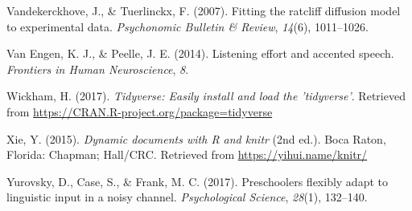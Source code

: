 \documentclass[english,man]{apa6}
\theoremstyle{definition}
\theoremstyle{definition}
\theoremstyle{definition}
\theoremstyle{remark}
\begin{document}
\leavevmode\hypertarget{ref-vandekerckhove2007fitting}{}%
Vandekerckhove, J., \& Tuerlinckx, F. (2007). Fitting the ratcliff
diffusion model to experimental data. \emph{Psychonomic Bulletin \&
Review}, \emph{14}(6), 1011--1026.

\leavevmode\hypertarget{ref-van2014listening}{}%
Van Engen, K. J., \& Peelle, J. E. (2014). Listening effort and accented
speech. \emph{Frontiers in Human Neuroscience}, \emph{8}.

\leavevmode\hypertarget{ref-R-tidyverse}{}%
Wickham, H. (2017). \emph{Tidyverse: Easily install and load the
'tidyverse'}. Retrieved from
\url{https://CRAN.R-project.org/package=tidyverse}

\leavevmode\hypertarget{ref-R-knitr}{}%
Xie, Y. (2015). \emph{Dynamic documents with R and knitr} (2nd ed.).
Boca Raton, Florida: Chapman; Hall/CRC. Retrieved from
\url{https://yihui.name/knitr/}

\leavevmode\hypertarget{ref-yurovsky2017preschoolers}{}%
Yurovsky, D., Case, S., \& Frank, M. C. (2017). Preschoolers flexibly
adapt to linguistic input in a noisy channel. \emph{Psychological
Science}, \emph{28}(1), 132--140.
\end{document}
